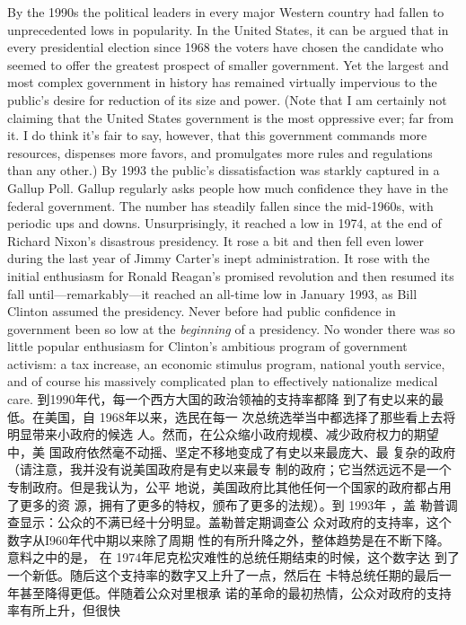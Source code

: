 \begin{paracol}{2}
\switchcolumn*
By the 1990s the political leaders in every major Western
country had fallen to unprecedented lows in popularity. In the
United States, it can be argued that in every presidential election since 1968 the voters have chosen the candidate who
seemed to offer the greatest prospect of smaller government.
Yet the largest and most complex government in history has remained virtually impervious to the public's desire for reduction
of its size and power. (Note that I am certainly not claiming
that the United States government is the most oppressive ever;
far from it. I do think it's fair to say, however, that this government commands more resources, dispenses more favors, and
promulgates more rules and regulations than any other.) By
1993 the public's dissatisfaction was starkly captured in a
Gallup Poll. Gallup regularly asks people how much confidence
they have in the federal government. The number has steadily
fallen since the mid-1960s, with periodic ups and downs. Unsurprisingly, it reached a low in 1974, at the end of Richard Nixon's disastrous presidency. It rose a bit and then fell even
lower during the last year of Jimmy Carter's inept administration. It rose with the initial enthusiasm for Ronald Reagan's
promised revolution and then resumed its fall until---remarkably---it reached an all-time low in January 1993, as Bill Clinton assumed the presidency. Never before had public
confidence in government been so low at the \textit{beginning} of a presidency. No wonder there was so little popular enthusiasm for
Clinton's ambitious program of government activism: a tax increase, an economic stimulus program, national youth service,
and of course his massively complicated plan to effectively nationalize medical care.
\switchcolumn
到1990年代，每一个西方大国的政治领袖的支持率都降
到了有史以来的最低。在美国，自 1968年以来，选民在每一
次总统选举当中都选择了那些看上去将明显带来小政府的候选
人。然而，在公众缩小政府规模、减少政府权力的期望中，美
国政府依然毫不动摇、坚定不移地变成了有史以来最庞大、最
复杂的政府（请注意，我并没有说美国政府是有史以来最专
制的政府；它当然远远不是一个专制政府。但是我认为，公平
地说，美国政府比其他任何一个国家的政府都占用了更多的资
源，拥有了更多的特权，颁布了更多的法规）。到 1993年 ，盖
勒普调查显示：公众的不满已经十分明显。盖勒普定期调查公
众对政府的支持率，这个数字从I960年代中期以来除了周期
性的有所升降之外，整体趋势是在不断下降。意料之中的是，
在 1974年尼克松灾难性的总统任期结束的时候，这个数字达
到了一个新低。随后这个支持率的数字又上升了一点，然后在
卡特总统任期的最后一年甚至降得更低。伴随着公众对里根承
诺的革命的最初热情，公众对政府的支持率有所上升，但很快

\end{paracol}
